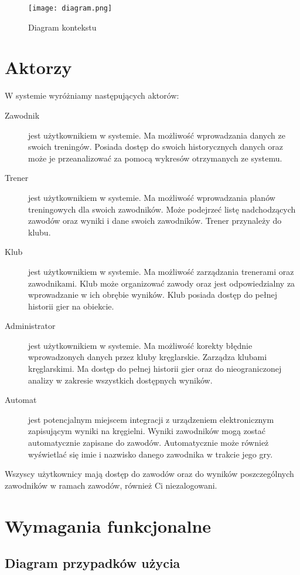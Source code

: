 \documentclass[polish, a4paper]{article}
\begin{document}
\begin{figure}[H]
  \centering
  \texttt{[image: diagram.png]}
  \caption{Diagram kontekstu}
\end{figure}

\section{Aktorzy}

W systemie wyróżniamy następujących aktorów:

\begin{description}
\item[Zawodnik]{ jest użytkownikiem w systemie. Ma możliwość wprowadzania danych ze swoich treningów. Posiada dostęp do swoich historycznych danych oraz może je przeanalizować za pomocą wykresów otrzymanych ze systemu.}
\item[Trener]{ jest użytkownikiem w systemie. Ma możliwość wprowadzania planów treningowych dla swoich zawodników. Może podejrzeć listę nadchodzących zawodów oraz wyniki i dane swoich zawodników. Trener przynależy do klubu.}
\item[Klub]{ jest użytkownikiem w systemie. Ma możliwość zarządzania trenerami oraz zawodnikami. Klub może organizować zawody oraz jest odpowiedzialny za wprowadzanie w ich obrębie wyników. Klub posiada dostęp do pełnej historii gier na obiekcie.}
\item[Administrator]{ jest użytkownikiem w systemie. Ma możliwość korekty błędnie wprowadzonych danych przez kluby kręglarskie. Zarządza klubami kręglarskimi. Ma dostęp do pełnej historii gier oraz do nieograniczonej analizy w zakresie wszystkich dostępnych wyników.}
\item[Automat]{ jest potencjalnym miejscem integracji z urządzeniem elektronicznym zapisującym wyniki na kręgielni. Wyniki zawodników mogą zostać automatycznie zapisane do zawodów. Automatycznie może również wyświetlać się imie i nazwisko danego zawodnika w trakcie jego gry.}
\end{description}

Wszyscy użytkownicy mają dostęp do zawodów oraz do wyników poszczególnych zawodników w ramach zawodów, również Ci niezalogowani.


\section{Wymagania funkcjonalne}
\subsection{Diagram przypadków użycia}
\end{document}

